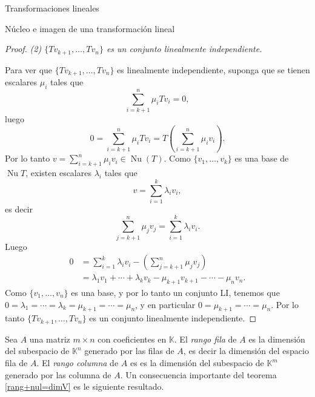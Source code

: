 \documentclass[a4paper,12pt,twoside,spanish,reqno]{amsbook}
\numberwithin{equation}{section}
\theoremstyle{definition}
\theoremstyle{remark}
\newcommand{\nuc}{\operatorname{Nu}}
\newcommand{\K}{\mathbb K}
\begin{document}
\begin{chapter}{Transformaciones lineales}
\begin{section}{Núcleo e imagen de una transformación lineal}
\begin{proof}
             \textit{(2) $\{Tv_{k+1},\ldots,Tv_n \}$ es un conjunto linealmente independiente.}
             
             Para ver que  $\{Tv_{k+1},\ldots,Tv_n \}$ es linealmente independiente, suponga que se tienen escalares $\mu_i$ tales que
             $$
             \sum_{i=k+1}^n \mu_i Tv_i = 0,
             $$
             luego
             $$
             0 = \sum_{i=k+1}^n \mu_i Tv_i =   T(\sum_{i=k+1}^n\mu_iv_i).  
             $$
             Por lo tanto $v =\sum_{i=k+1}^n \mu_iv_i\in \nuc(T)$. Como  $\{v_1,\ldots,v_k \}$ es una base de $\nuc T$,  existen escalares $\lambda_i$ tales que
             $$
             v =  \sum_{i=1}^k \lambda_i v_i,
             $$
             es decir
             $$
             \sum_{j=k+1}^n \mu_jv_j =  \sum_{i=1}^k \lambda_i v_i.
             $$
             Luego
             \begin{align*}
                     0 &= \sum_{i=1}^k \lambda_i v_i - (\sum_{j=k+1}^n \mu_jv_j) \\
                     &= \lambda_1 v_1 + \cdots +\lambda_k v_k - \mu_{k+1}v_{k+1} -\cdots-\mu_nv_n.
             \end{align*}
             Como $\{v_1,\ldots,v_n \}$ es una base, y por lo tanto un conjunto LI,  tenemos que  $0=\lambda_1=\cdots=\lambda_k=\mu_{k+1}=\cdots=\mu_n$, y  en particular $0=\mu_{k+1}=\cdots=\mu_n$. Por lo tanto $\{Tv_{k+1},\ldots,Tv_n \}$ es un conjunto linealmente independiente.		  
        \end{proof}
        
    
        
        Sea $A$ una matriz $m \times n$ con coeficientes  en $\K$. El  \textit{rango fila} de $A$ es la dimensión del subespacio de $\K^n$ generado por las filas de $A$, es decir la dimensión del espacio fila de $A$. El \textit{rango columna} de $A$  es es la dimensión del subespacio de $\K^m$ generado por las columna de $A$. Un  consecuencia importante del teorema \ref{rang+nul=dimV} es le siguiente resultado. 
        

\end{section}
\end{chapter}
\end{document}
